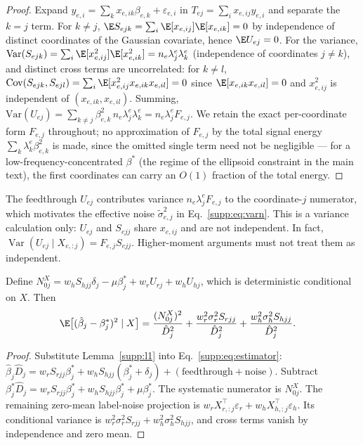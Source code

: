 \begin{proof}
Expand $y_{e,i} = \sum_k x_{e,ik}\beta_{e,k} + \varepsilon_{e,i}$ in $T_{ej} = \sum_i x_{e,ij} y_{e,i}$ and separate the $k = j$ term.
For $k \neq j$, $\E S_{ejk} = \sum_i \E[x_{e,ij}]\E[x_{e,ik}] = 0$ by independence of distinct coordinates of the Gaussian covariate, hence $\E U_{ej} = 0$.
For the variance, $\mathrm{Var}(S_{ejk}) = \sum_i \E[x_{e,ij}^2]\E[x_{e,ik}^2] = n_e \lambda^e_j \lambda^e_k$ (independence of coordinates $j \neq k$), and distinct cross terms are uncorrelated: for $k \neq l$, $\mathrm{Cov}(S_{ejk}, S_{ejl}) = \sum_i \E[x_{e,ij}^2 x_{e,ik} x_{e,il}] = 0$ since $\E[x_{e,ik}x_{e,il}] = 0$ and $x_{e,ij}^2$ is independent of $(x_{e,ik}, x_{e,il})$.
Summing, $\mathrm{Var}(U_{ej}) = \sum_{k\neq j} \beta_{e,k}^2 \, n_e \lambda^e_j \lambda^e_k = n_e \lambda^e_j F_{e,j}$.
We retain the exact per-coordinate form $F_{e,j}$ throughout; no approximation of $F_{e,j}$ by the total signal energy $\sum_k \lambda^e_k\beta_{e,k}^2$ is made, since the omitted single term need not be negligible --- for a low-frequency-concentrated $\beta^*$ (the regime of the ellipsoid constraint in the main text), the first coordinates can carry an $O(1)$ fraction of the total energy.
\end{proof}

\begin{remark}
The feedthrough $U_{ej}$ contributes variance $n_e\lambda^e_j F_{e,j}$ to the coordinate-$j$ numerator, which motivates the effective noise $\tilde\sigma_{e,j}^2$ in Eq.~\eqref{supp:eq:varn}. This is a variance calculation only: $U_{ej}$ and $S_{ejj}$ share $x_{e,ij}$ and are not independent. In fact, $\operatorname{Var}(U_{ej}\mid X_{e,:j})=F_{e,j}S_{ejj}$. Higher-moment arguments must not treat them as independent.
\end{remark}

\begin{lemma}\label{supp:l2}
Define $N_{0j}^{X}=w_hS_{hjj}\delta_j-\mu\beta^*_j+w_rU_{rj}+w_hU_{hj}$, which is deterministic conditional on $X$. Then
\begin{align}
  \E\big[(\hat\beta_j-\beta^*_j)^2\mid X\big]
  &=\frac{(N_{0j}^{X})^2}{\hat D_j^2}
  +\frac{w_r^2\sigma_r^2S_{rjj}}{\hat D_j^2}
  +\frac{w_h^2\sigma_h^2S_{hjj}}{\hat D_j^2}.
  \label{supp:eq:l2}
\end{align}
\end{lemma}

\begin{proof}
Substitute Lemma~\ref{supp:l1} into Eq.~\eqref{supp:eq:estimator}:
$\hat\beta_j \hat D_j = w_r S_{rjj}\beta^*_j + w_h S_{hjj}(\beta^*_j + \delta_j) + (\text{feedthrough} + \text{noise})$.
Subtract $\beta^*_j \hat D_j = w_r S_{rjj}\beta^*_j + w_h S_{hjj}\beta^*_j + \mu\beta^*_j$. The systematic numerator is $N_{0j}^{X}$. The remaining zero-mean label-noise projection is $w_rX_{r,:j}^\top\varepsilon_r+w_hX_{h,:j}^\top\varepsilon_h$. Its conditional variance is $w_r^2\sigma_r^2S_{rjj}+w_h^2\sigma_h^2S_{hjj}$, and cross terms vanish by independence and zero mean.
\end{proof}


